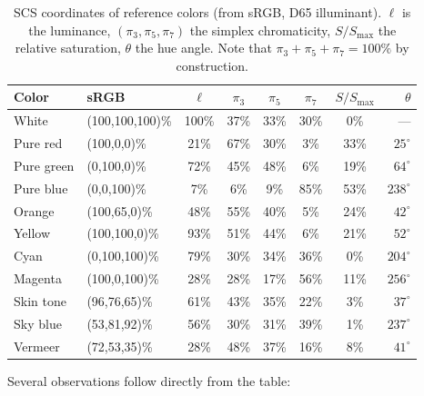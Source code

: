 \documentclass[12pt,a4paper]{article}
\begin{document}
\begin{table}[ht]
\centering
\caption{SCS coordinates of reference colors (from sRGB, D65 illuminant).
$\ell$ is the luminance, $(\pi_3, \pi_5, \pi_7)$ the simplex
chromaticity, $S/S_{\max}$ the relative saturation, $\theta$ the hue
angle. Note that $\pi_3 + \pi_5 + \pi_7 = 100\%$ by construction.}
\label{tab:ref_colors}
\small
\begin{tabular}{llcccccr}
\toprule
Color & sRGB & $\ell$ & $\pi_3$ & $\pi_5$ & $\pi_7$ & $S/S_{\max}$ & $\theta$ \\
\midrule
White       & (100,100,100)\% & 100\% & 37\% & 33\% & 30\% & 0\%  & --- \\
Pure red    & (100,0,0)\%     & 21\%  & 67\% & 30\% & 3\%  & 33\% & $25^\circ$ \\
Pure green  & (0,100,0)\%     & 72\%  & 45\% & 48\% & 6\%  & 19\% & $64^\circ$ \\
Pure blue   & (0,0,100)\%     & 7\%   & 6\%  & 9\%  & 85\% & 53\% & $238^\circ$ \\
Orange      & (100,65,0)\%    & 48\%  & 55\% & 40\% & 5\%  & 24\% & $42^\circ$ \\
Yellow      & (100,100,0)\%   & 93\%  & 51\% & 44\% & 6\%  & 21\% & $52^\circ$ \\
Cyan        & (0,100,100)\%   & 79\%  & 30\% & 34\% & 36\% & 0\%  & $204^\circ$ \\
Magenta     & (100,0,100)\%   & 28\%  & 28\% & 17\% & 56\% & 11\% & $256^\circ$ \\
Skin tone   & (96,76,65)\%    & 61\%  & 43\% & 35\% & 22\% & 3\%  & $37^\circ$ \\
Sky blue    & (53,81,92)\%    & 56\%  & 30\% & 31\% & 39\% & 1\%  & $237^\circ$ \\
Vermeer     & (72,53,35)\%    & 28\%  & 48\% & 37\% & 16\% & 8\%  & $41^\circ$ \\
\bottomrule
\end{tabular}
\end{table}

Several observations follow directly from the table:
\end{document}
